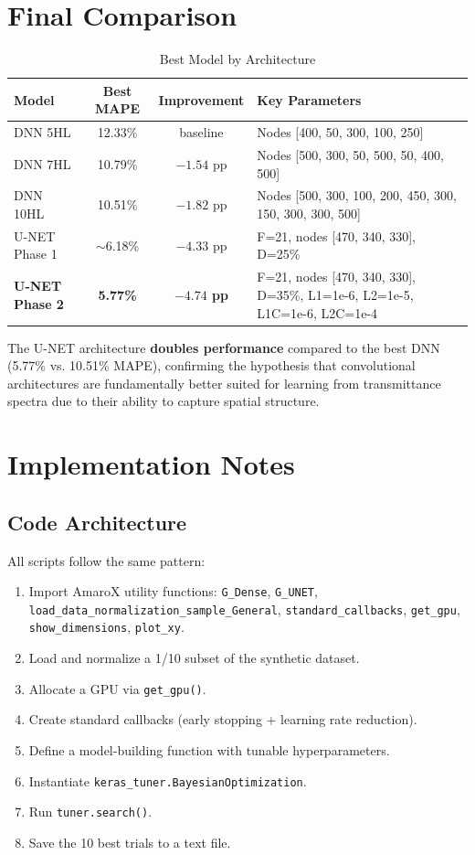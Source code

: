 \documentclass[11pt,a4paper]{article}
\begin{document}
\section{Final Comparison}

\begin{table}[H]
\centering
\caption{Best Model by Architecture}
\begin{tabular}{lccp{6cm}}
\toprule
\textbf{Model} & \textbf{Best MAPE} & \textbf{Improvement} & \textbf{Key Parameters} \\
\midrule
DNN 5HL  & 12.33\% & baseline & Nodes [400, 50, 300, 100, 250] \\
DNN 7HL  & 10.79\% & $-1.54$ pp & Nodes [500, 300, 50, 500, 50, 400, 500] \\
DNN 10HL & 10.51\% & $-1.82$ pp & Nodes [500, 300, 100, 200, 450, 300, 150, 300, 300, 500] \\
U-NET Phase 1 & $\sim$6.18\% & $-4.33$ pp & F=21, nodes [470, 340, 330], D=25\% \\
\textbf{U-NET Phase 2} & \textbf{5.77\%} & \textbf{$-4.74$ pp} & F=21, nodes [470, 340, 330], D=35\%, L1=1e-6, L2=1e-5, L1C=1e-6, L2C=1e-4 \\
\bottomrule
\end{tabular}
\end{table}

The U-NET architecture \textbf{doubles performance} compared to the best DNN (5.77\% vs. 10.51\% MAPE), confirming the hypothesis that convolutional architectures are fundamentally better suited for learning from transmittance spectra due to their ability to capture spatial structure.

\section{Implementation Notes}

\subsection{Code Architecture}

All scripts follow the same pattern:

\begin{enumerate}
    \item Import AmaroX utility functions: \texttt{G\_Dense}, \texttt{G\_UNET}, \texttt{load\_data\_normalization\_sample\_General}, \texttt{standard\_callbacks}, \texttt{get\_gpu}, \texttt{show\_dimensions}, \texttt{plot\_xy}.
    \item Load and normalize a 1/10 subset of the synthetic dataset.
    \item Allocate a GPU via \texttt{get\_gpu()}.
    \item Create standard callbacks (early stopping + learning rate reduction).
    \item Define a model-building function with tunable hyperparameters.
    \item Instantiate \texttt{keras\_tuner.BayesianOptimization}.
    \item Run \texttt{tuner.search()}.
    \item Save the 10 best trials to a text file.
\end{enumerate}
\end{document}

